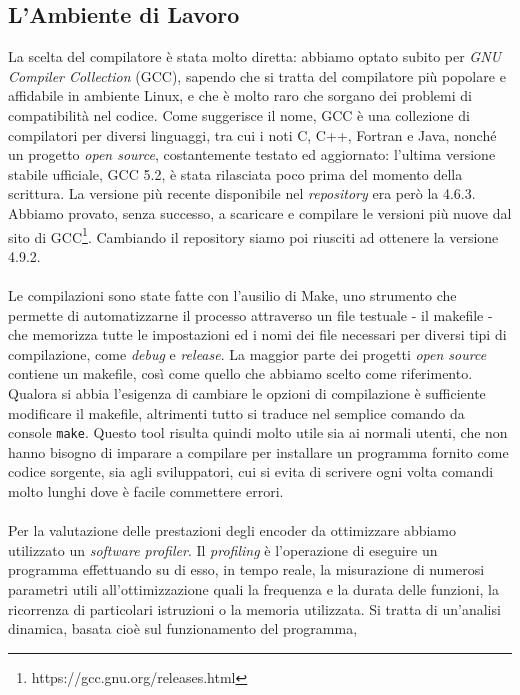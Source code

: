 \subsection{L'Ambiente di Lavoro}
La scelta del compilatore è stata molto diretta: abbiamo 
optato subito per 
\emph{GNU Compiler Collection} (GCC), sapendo che si tratta del compilatore più 
popolare e affidabile in ambiente Linux, e che è molto raro che sorgano dei 
problemi di compatibilità nel codice. Come suggerisce il nome, GCC è una 
collezione di compilatori per diversi linguaggi, tra cui i noti C, C++, Fortran 
e Java, nonché un progetto \emph{open source}, costantemente testato ed 
aggiornato: 
l'ultima versione stabile ufficiale, GCC 5.2, è stata rilasciata poco prima 
del momento della scrittura. La versione più recente disponibile nel 
\emph{repository} era però la 4.6.3. Abbiamo provato, senza successo, a 
scaricare e compilare le versioni più nuove dal sito di 
GCC\footnote{https://gcc.gnu.org/releases.html}. Cambiando il repository siamo 
poi riusciti ad ottenere la versione 4.9.2.
\\ \\
Le compilazioni sono state fatte con l'ausilio di Make, 
uno strumento 
che permette di automatizzarne il processo attraverso un file 
testuale - il makefile - che memorizza tutte le impostazioni ed i nomi dei file 
necessari per diversi tipi di compilazione, come \emph{debug} e \emph{release}. 
La maggior 
parte dei progetti \emph{open source} contiene un makefile, così come quello 
che 
abbiamo scelto come riferimento. Qualora si abbia l'esigenza di cambiare le 
opzioni di 
compilazione è sufficiente modificare il makefile, altrimenti tutto si traduce 
nel semplice comando da console \verb|make|. Questo tool risulta quindi molto 
utile sia ai normali utenti, che non hanno bisogno di imparare a compilare per 
installare un 
programma fornito come codice sorgente, sia agli sviluppatori, cui 
si evita di scrivere ogni volta 
comandi molto lunghi dove è facile commettere errori.
\\ \\
Per la valutazione delle prestazioni degli encoder da ottimizzare abbiamo 
utilizzato un \emph{software profiler}.
Il \emph{profiling} è l'operazione di eseguire un programma effettuando su di 
esso, in tempo reale, la misurazione di numerosi parametri utili 
all'ottimizzazione quali la frequenza e la durata delle  
funzioni, la ricorrenza di particolari istruzioni o la memoria utilizzata.
Si tratta di un'analisi dinamica, basata cioè sul funzionamento del programma, 
